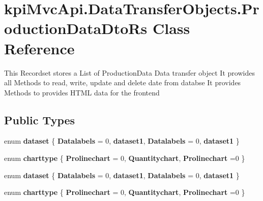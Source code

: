 \hypertarget{classkpi_mvc_api_1_1_data_transfer_objects_1_1_production_data_dto_rs}{}\section{kpi\+Mvc\+Api.\+Data\+Transfer\+Objects.\+Production\+Data\+Dto\+Rs Class Reference}
\label{classkpi_mvc_api_1_1_data_transfer_objects_1_1_production_data_dto_rs}


This Recordset stores a List of Production\+Data Data transfer object It prowides all Methods to read, write, update and delete date from databse It provides Methods to provides H\+T\+ML data for the frontend  


\subsection*{Public Types}
\begin{DoxyCompactItemize}
\item 
\mbox{\label{classkpi_mvc_api_1_1_data_transfer_objects_1_1_production_data_dto_rs_ab356c7600182705746e7b61967dd63df}} 
enum {\bfseries dataset} \{ {\bfseries Datalabels} = 0, 
{\bfseries dataset1}, 
{\bfseries Datalabels} = 0, 
{\bfseries dataset1}
 \}
\item 
\mbox{\label{classkpi_mvc_api_1_1_data_transfer_objects_1_1_production_data_dto_rs_a45716f0cdee396710530b9562be56f9a}} 
enum {\bfseries charttype} \{ {\bfseries Prolinechart} = 0, 
{\bfseries Quantitychart}, 
{\bfseries Prolinechart} =0
 \}
\item 
\mbox{\label{classkpi_mvc_api_1_1_data_transfer_objects_1_1_production_data_dto_rs_ab356c7600182705746e7b61967dd63df}} 
enum {\bfseries dataset} \{ {\bfseries Datalabels} = 0, 
{\bfseries dataset1}, 
{\bfseries Datalabels} = 0, 
{\bfseries dataset1}
 \}
\item 
\mbox{\label{classkpi_mvc_api_1_1_data_transfer_objects_1_1_production_data_dto_rs_a45716f0cdee396710530b9562be56f9a}} 
enum {\bfseries charttype} \{ {\bfseries Prolinechart} = 0, 
{\bfseries Quantitychart}, 
{\bfseries Prolinechart} =0
 \}
\end{DoxyCompactItemize}
